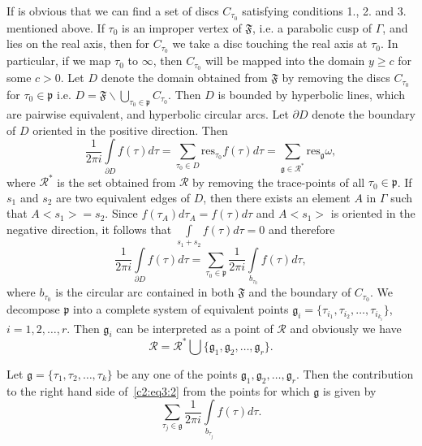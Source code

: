 If is obvious that we can find a set of discs $C_{\tau_0}$ satisfying
conditions 1., 2. and 3. mentioned above. If $\tau_0$ is an improper
vertex of $\mathfrak{F}$, i.e. a parabolic cusp of $\Gamma$, and lies
on the real axis, then for $C_{\tau_0}$ we take a disc touching the
real axis at $\tau_0$. In particular, if we map $\tau_0$ to $\infty$,
then \pageoriginale $C_{\tau_0}$ will be mapped into the domain $y\geq
c$ for some $c>0$. Let $D$ denote the domain obtained from
$\mathfrak{F}$ by removing the discs $C_{\tau_0}$ for $\tau_0
\in \mathfrak{p}$ i.e. $D = \mathfrak{F}\backslash
\bigcup_{\tau_0 \in \mathfrak{p}}C_{\tau_0}$. Then $D$ is
bounded by hyperbolic lines, which are pairwise equivalent, and
hyperbolic circular arcs. Let $\partial D$ denote the boundary of $D$
oriented in the positive direction. Then 
\begin{equation*}
\frac{1}{2\pi i} \int\limits_{\partial D} f(\tau)d\tau = \sum_{\tau_0
  \in D} \text{res}_{\tau_0} f(\tau) d\tau =
\sum_{\mathfrak{g}\in \mathscr{R}^{\ast}} \text{res}_{\mathfrak{g}}
\omega, \tag{1}\label{c2:eq3:1}
\end{equation*}
where $\mathscr{R}^{\ast}$ is the set obtained from $\mathscr{R}$ by
removing the trace-points of all $\tau_0 \in \mathfrak{p}$. If
$s_1$ and $s_2$ are two equivalent edges of $D$, then there exists an
element $A$ in $\Gamma$ such that $A<s_1>=s_2$. Since
$f(\tau_A)d\tau_A=f(\tau)d\tau$ and $A<s_1>$ is oriented in the
negative direction, it follows that
$\int\limits_{s_1+s_2}f(\tau)d\tau=0$ and therefore
\begin{equation*}
\frac{1}{2\pi i} \int\limits_{\partial D} f(\tau)d\tau =
\sum_{\tau_0\in \mathfrak{p}} \frac{1}{2\pi
  i}\int\limits_{b_{\tau_0}} f(\tau) d\tau, \tag{2}\label{c2:eq3:2}
\end{equation*}
where $b_{\tau_0}$ is the circular arc contained in both
$\mathfrak{F}$ and the boundary of $C_{\tau_0}$. We decompose
$\mathfrak{p}$ into a complete system of equivalent points
$\mathfrak{g}_i= \{\tau_{i_1}, \tau_{i_2},\ldots, \tau_{i_{k_i}}\}$,
$i = 1, 2, \ldots, r$. Then $\mathfrak{g}_i$ can be interpreted as a
point of $\mathscr{R}$ and obviously we have 
\begin{equation*}
 \mathscr{R} = \mathscr{R}^{\ast} \bigcup \{\mathfrak{g}_1,
 \mathfrak{g}_2, \ldots, \mathfrak{g}_r\}.\tag{3}\label{c2:eq3:3}
\end{equation*}

Let $\mathfrak{g} =\{\tau_1, \tau_2, \ldots, \tau_k\}$ be any one of
the points $\mathfrak{g}_1, \mathfrak{g}_2, \ldots,
\mathfrak{g}_r$. Then the contribution to the right hand side of~\eqref{c2:eq3:2}
from the points for which $\mathfrak{g}$ is given \pageoriginale by 
$$
\sum_{\tau_j \in \mathfrak{g}} \frac{1}{2 \pi i}
\int\limits_{b_{\tau_j}} f(\tau)d\tau.
$$

